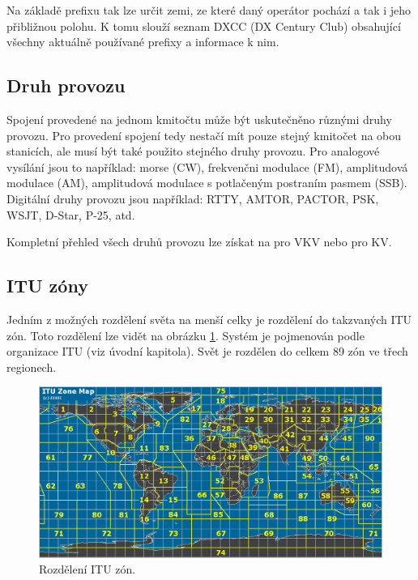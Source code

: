 Na základě prefixu tak lze určit zemi, ze které daný operátor pochází a tak i
jeho přibližnou polohu. K tomu slouží seznam DXCC (DX Century Club) \cite{dxcc} %
obsahující všechny aktuálně používané prefixy a informace k nim.

\subsection{Druh provozu}

Spojení provedené na jednom kmitočtu může být uskutečněno různými druhy provozu. Pro provedení spojení tedy nestačí mít pouze stejný kmitočet
na obou stanicích, ale musí být také použito stejného druhy provozu. Pro analogové vysílání jsou to například: morse (CW), frekvenčni modulace (FM), amplitudová modulace (AM),
amplitudová modulace s potlačeným postraním pasmem (SSB). Digitální druhy provozu jsou například: RTTY, AMTOR, PACTOR, PSK, WSJT, D-Star, P-25, atd.

Kompletní přehled všech druhů provozu lze získat na \cite{plan_vkv} pro VKV nebo \cite{plan_kv} pro KV.

\subsection{ITU zóny}

Jedním z možných rozdělení světa na menší celky je rozdělení do takzvaných ITU zón.
Toto rozdělení lze vidět na obrázku \ref{fig:itu_zony}.
Systém je pojmenován podle organizace ITU (viz úvodní kapitola). Svět je rozdělen do celkem 
89 zón ve třech regionech.

\begin{figure}[h]
\centering
\includegraphics[trim=0cm 0cm 0cm 0cm, scale=0.4]{fig/itu-zone}
\caption{Rozdělení ITU zón.}
\label{fig:itu_zony}
\end{figure}

